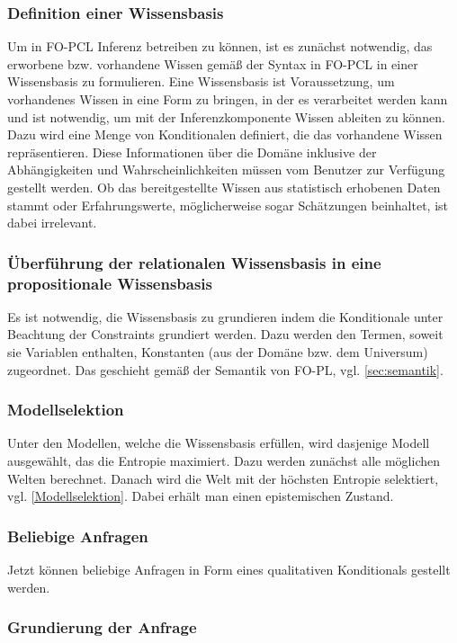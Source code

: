 \documentclass[a4paper, 11pt]{book}
\begin{document}
\subsubsection{Definition einer Wissensbasis}	
Um in FO-PCL Inferenz betreiben zu können, ist es zunächst notwendig, das erworbene bzw. vorhandene Wissen gemäß der Syntax in FO-PCL in einer Wissensbasis zu formulieren. Eine Wissensbasis ist Voraussetzung, um vorhandenes Wissen in eine Form zu bringen, in der es verarbeitet werden kann und ist notwendig, um mit der Inferenzkomponente Wissen ableiten zu können. Dazu wird eine Menge von Konditionalen definiert, die das vorhandene Wissen repräsentieren.  Diese Informationen über die Domäne inklusive der Abhängigkeiten und Wahrscheinlichkeiten müssen vom Benutzer zur Verfügung gestellt werden. Ob das bereitgestellte Wissen aus statistisch erhobenen Daten stammt oder Erfahrungswerte, möglicherweise sogar Schätzungen beinhaltet, ist dabei irrelevant.

\subsubsection{Überführung der relationalen Wissensbasis in eine propositionale Wissensbasis}
Es ist notwendig, die Wissensbasis zu grundieren indem die Konditionale unter Beachtung der Constraints grundiert werden. Dazu werden den Termen, soweit sie Variablen enthalten, Konstanten (aus der Domäne bzw. dem Universum) zugeordnet. Das geschieht gemäß der Semantik von FO-PL, vgl. \ref{sec:semantik}.
	
\subsubsection{Modellselektion}
Unter den Modellen, welche die Wissensbasis erfüllen, wird dasjenige Modell ausgewählt, das die Entropie maximiert. Dazu werden zunächst alle möglichen Welten berechnet. Danach wird die Welt mit der höchsten Entropie selektiert, vgl. \ref{Modellselektion}. Dabei erhält man einen epistemischen Zustand.
	
\subsubsection{Beliebige Anfragen}
Jetzt können beliebige Anfragen in Form eines qualitativen Konditionals gestellt werden.   

\subsubsection{Grundierung der Anfrage}
\end{document}
